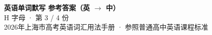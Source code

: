 \documentclass[10pt,a4paper]{article}
\begin{document}
\pagestyle{plain}

\begin{center}
{\LARGE\bfseries 英语单词默写 \quad 参考答案（英 $\to$ 中）}\\[0.22em]
{\large H 字母 · 第 3 / 4 份}\\[0.18em]
{\small 2026年上海市高考英语词汇用法手册 · 参照普通高中英语课程标准}
\end{center}

\vspace{0.2em}
\noindent{\color{rulegray}\rule{\textwidth}{0.8pt}}

\vspace{0.35em}

\vspace{0.25em}
\renewcommand{\arraystretch}{1.32}
\end{document}
